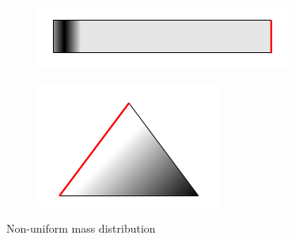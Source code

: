 \documentclass{article}
\begin{document}
\begin{itemize}
     \begin{figure}[h!]
        \centering
        \begin{subfigure}[b]{0.3\textwidth}
          \includegraphics[width=\textwidth]{rectangle_weighted.png}
        \end{subfigure}
        \begin{subfigure}[b]{0.3\textwidth}
          \includegraphics[width=\textwidth]{weighted_triangle.png}
        \end{subfigure}
        \caption{Non-uniform mass distribution }
      \end{figure}

\end{itemize}
\end{document}
